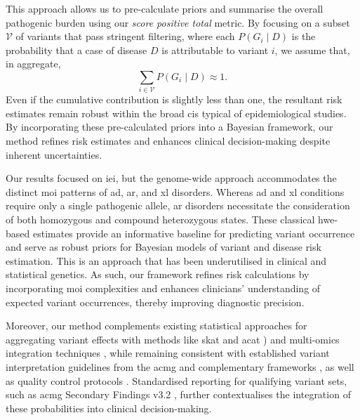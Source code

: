 This approach allows us to pre-calculate priors and summarise the overall pathogenic burden using our \emph{score positive total} metric. By focusing on a subset \(\mathcal{V}\) of variants that pass stringent filtering, where each \(P(G_i \mid D)\) is the probability that a case of disease \(D\) is attributable to variant \(i\), we assume that, in aggregate,
\[
\sum_{i\in\mathcal{V}} P(G_i\mid D) \approx 1.
\]
Even if the cumulative contribution is slightly less than one, the resultant risk estimates remain robust within the broad \ac{ci}s typical of epidemiological studies. By incorporating these pre-calculated priors into a Bayesian framework, our method refines risk estimates and enhances clinical decision-making despite inherent uncertainties.

Our results focused on \ac{iei}, but the genome-wide approach accommodates the distinct \ac{moi} patterns of \ac{ad}, \ac{ar}, and \ac{xl} disorders. Whereas \ac{ad} and \ac{xl} conditions require only a single pathogenic allele, \ac{ar} disorders necessitate the consideration of both homozygous and compound heterozygous states. These classical \ac{hwe}-based estimates provide an informative baseline for predicting variant occurrence and serve as robust priors for Bayesian models of variant and disease risk estimation. This is an approach that has been underutilised in clinical and statistical genetics. As such, our framework refines risk calculations by incorporating \ac{moi} complexities and enhances clinicians’ understanding of expected variant occurrences, thereby improving diagnostic precision.

Moreover, our method complements existing statistical approaches for aggregating variant effects with methods like \ac{skat} and \ac{acat} \cite{liu2019acat,li2020dynamic,wu2011rare,lee2012optimal}) and multi-omics integration techniques \cite{kong2018nature,howe2021within}, while remaining consistent with established variant interpretation guidelines from the \ac{acmg} \cite{richards2015standards} and complementary frameworks \cite{tavtigian2020fitting,li2017intervar}, as well as quality control protocols \cite{pedersen2021effective,anderson2010data}. Standardised reporting for qualifying variant sets, such as \ac{acmg} Secondary Findings v3.2 \cite{miller2023acmg}, further contextualises the integration of these probabilities into clinical decision-making.

